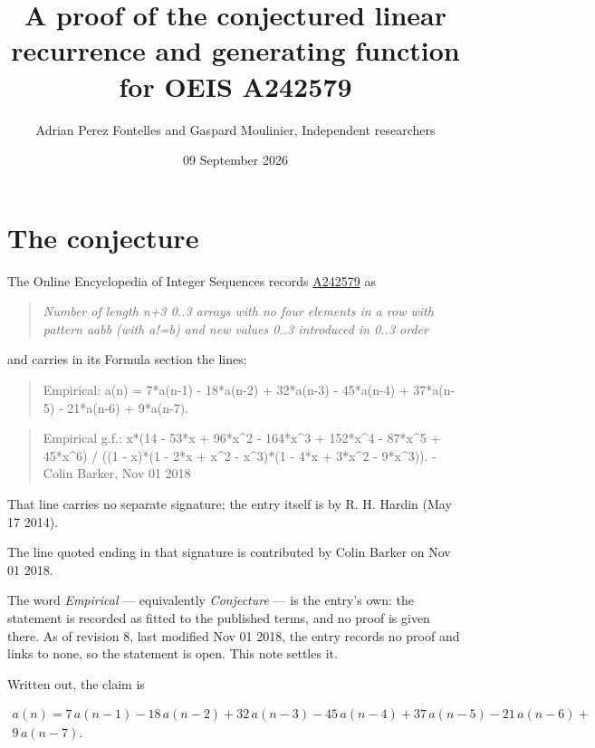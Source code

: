 \documentclass[11pt]{article}
\title{A proof of the conjectured linear recurrence and generating function for OEIS A242579}
\author{Adrian Perez Fontelles and Gaspard Moulinier, Independent researchers}
\date{09 September 2026}
\theoremstyle{definition}
\begin{document}
\maketitle
\section{The conjecture}

The Online Encyclopedia of Integer Sequences records \href{https://oeis.org/A242579}{A242579} as

\begin{quote}\itshape Number of length n+3 0..3 arrays with no four elements in a row with pattern aabb (with a!=b) and new values 0..3 introduced in 0..3 order\end{quote}

and carries in its Formula section the lines:

\begin{quote}\ttfamily Empirical: a(n) = 7*a(n-1) - 18*a(n-2) + 32*a(n-3) - 45*a(n-4) + 37*a(n-5) - 21*a(n-6) + 9*a(n-7).\end{quote}

\begin{quote}\ttfamily Empirical g.f.: x*(14 - 53*x + 96*x\textasciicircum{}2 - 164*x\textasciicircum{}3 + 152*x\textasciicircum{}4 - 87*x\textasciicircum{}5 + 45*x\textasciicircum{}6) / ((1 - x)*(1 - 2*x + x\textasciicircum{}2 - x\textasciicircum{}3)*(1 - 4*x + 3*x\textasciicircum{}2 - 9*x\textasciicircum{}3)). - Colin Barker, Nov 01 2018\end{quote}

That line carries no separate signature; the entry itself is by R. H. Hardin (May 17 2014).

The line quoted ending in that signature is contributed by Colin Barker on Nov 01 2018.

The word {\itshape Empirical} --- equivalently {\itshape Conjecture} --- is the entry's own: the statement is recorded as fitted to the published terms, and no proof is given there. As of revision 8, last modified Nov 01 2018, the entry records no proof and links to none, so the statement is open. This note settles it.

Written out, the claim is

\begin{multline*} a(n) = 7\,a(n-1) - 18\,a(n-2) + 32\,a(n-3) - 45\,a(n-4) + 37\,a(n-5) - 21\,a(n-6) + \\ 9\,a(n-7). \end{multline*}
\end{document}
